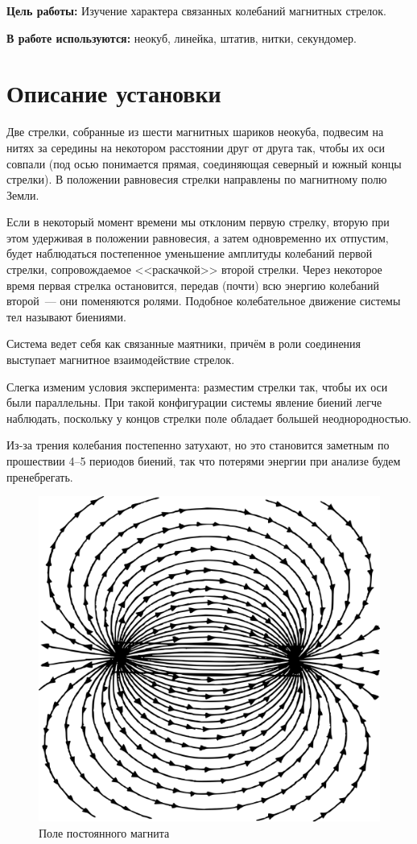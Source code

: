 \documentclass{letask}
\begin{document}


\textbf{Цель работы:} Изучение характера связанных колебаний магнитных стрелок.

\textbf{В работе используются:} неокуб, линейка, штатив, нитки, секундомер.

\section{Описание установки}  

Две стрелки, собранные из шести магнитных шариков неокуба, подвесим на нитях за середины на некотором расстоянии друг от друга так, чтобы их оси совпали (под осью понимается прямая, соединяющая северный и южный концы стрелки). В положении равновесия стрелки направлены по магнитному полю Земли.

Если в некоторый момент времени мы отклоним первую стрелку, вторую при этом удерживая в положении равновесия, а затем одновременно их отпустим, будет наблюдаться постепенное уменьшение амплитуды колебаний первой стрелки, сопровождаемое <<раскачкой>> второй стрелки. Через некоторое время первая стрелка остановится, передав (почти) всю энергию колебаний второй~--- они поменяются ролями. Подобное колебательное движение системы тел называют \textsf{биениями.}

Система ведет себя как связанные маятники, причём в роли соединения выступает магнитное взаимодействие стрелок. 

Слегка изменим условия эксперимента: разместим стрелки так, чтобы их оси были параллельны. При такой конфигурации системы явление биений легче наблюдать, поскольку у концов стрелки поле обладает большей неоднородностью.

Из-за трения колебания постепенно затухают, но это становится заметным по прошествии 4--5 периодов биений, так что потерями энергии при анализе будем пренебрегать.

\vfill
\begin{figure}[b]\centering
\includegraphics[width = 0.4\tw]{field}
\caption{Поле постоянного магнита}
\end{figure}
\end{document}

